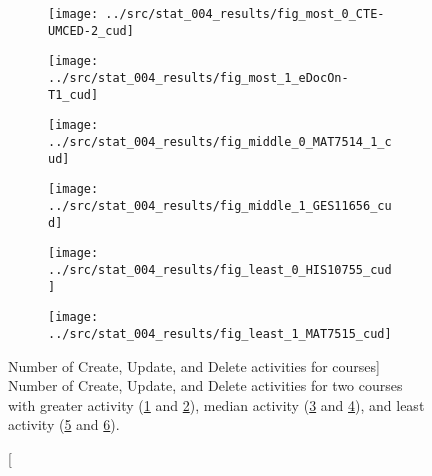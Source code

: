 \begin{figure}[h!]
    \centering

    \begin{subfigure}{.5\textwidth}
        \centering
        \texttt{[image: ../src/stat\_004\_results/fig\_most\_0\_CTE-UMCED-2\_cud]}
        \caption[]{}
        \label{subfig:stat_most_004_0_cud}
    \end{subfigure}%
    \begin{subfigure}{.5\textwidth}
        \centering
        \texttt{[image: ../src/stat\_004\_results/fig\_most\_1\_eDocOn-T1\_cud]}
        \caption[]{}
        \label{subfig:stat_most_004_1_cud}
    \end{subfigure}

    \begin{subfigure}{.5\textwidth}
        \centering
        \texttt{[image: ../src/stat\_004\_results/fig\_middle\_0\_MAT7514\_1\_cud]}
        \caption[]{}
        \label{subfig:stat_middle_004_0_cud}
    \end{subfigure}%
    \begin{subfigure}{.5\textwidth}
        \centering
        \texttt{[image: ../src/stat\_004\_results/fig\_middle\_1\_GES11656\_cud]}
        \caption[]{}
        \label{subfig:stat_middle_004_1_cud}
    \end{subfigure}

    \begin{subfigure}{.5\textwidth}
        \centering
        \texttt{[image: ../src/stat\_004\_results/fig\_least\_0\_HIS10755\_cud]}
        \caption[]{}
        \label{subfig:stat_least_004_0_cud}
    \end{subfigure}%
    \begin{subfigure}{.5\textwidth}
        \centering
        \texttt{[image: ../src/stat\_004\_results/fig\_least\_1\_MAT7515\_cud]}
        \caption[]{}
        \label{subfig:stat_least_004_1_cud}
    \end{subfigure}

    \caption
        [Number of Create, Update, and Delete activities for courses]
        {Number of Create, Update, and Delete activities for two courses with
        greater activity (\ref{subfig:stat_most_004_0_cud} and
        \ref{subfig:stat_most_004_1_cud}), median activity
        (\ref{subfig:stat_middle_004_0_cud} and
        \ref{subfig:stat_middle_004_1_cud}), and least activity
        (\ref{subfig:stat_least_004_0_cud} and
        \ref{subfig:stat_least_004_1_cud}).}

    \label{fig:stat_004_cud}
\end{figure}

